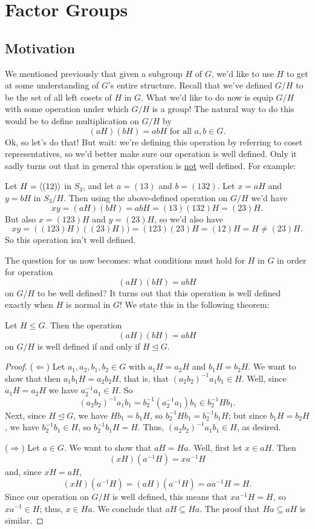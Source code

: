 \chapter{Factor Groups}\label{factorgps}%

\section{Motivation}

We mentioned previously that given a subgroup $H$ of $G$, we'd like
to use $H$ to get at some understanding of $G$'s entire structure.
Recall that we've defined $G/H$ to be the set of all left cosets of
$H$ in $G$.  What we'd like to do now is equip $G/H$ with some
operation under which $G/H$ is a group!  The natural way to do this
would be to define multiplication on $G/H$ by
$$(aH)(bH)=abH \mbox{ for all }a,b\in G.$$
Ok, so let's do that!  But wait: we're defining this operation
by referring to coset representatives, so we'd better make sure
our operation is well defined. Only it sadly turns out that in
general this operation is \underline{not} well defined. For
example:


\begin{example}{} Let $H=\langle(12)\rangle$ in $S_3$, and let $a=(13)$ and
$b=(132)$.  Let $x=aH$ and $y=bH$ in $S_3/H$. Then using the
above-defined operation on $G/H$ we'd have
$$xy=(aH)(bH)=abH=(13)(132)H=(23)H.$$ But also $x=(123)H$ and $y=(23)H$, so
we'd also have
$$xy=((123)H)((23)H))=(123)(23)H=(12)H=H\neq (23)H.$$
So this operation isn't well defined. \end{example}

 The question for us now becomes: what conditions must hold
for $H$ in $G$ in order for operation $$(aH)(bH)=abH$$ on $G/H$
to be well defined?  It turns out that this operation is well
defined exactly when $H$ is normal in $G$! We state this in the
following theorem:

\begin{thm}\label{} Let $H\leq G$.  Then the operation $$(aH)(bH)=abH$$ on
$G/H$ is well defined if and only if $H \unlhd G$. \end{thm}

\begin{proof}

($\Leftarrow$)  Let $a_1,a_2,b_1,b_2\in G$ with $a_1H=a_2H$ and
$b_1H=b_2H$.  We want to show that then $a_1b_1H=a_2b_2H$, that is,
that $(a_2b_2)^{-1}a_1b_1\in H$. Well, since $a_1H=a_2H$ we have
$a_2^{-1}a_1\in H$. So
$$(a_2b_2)^{-1}a_1b_1=b_2^{-1}(a_2^{-1}a_1)b_1 \in b_2^{-1}Hb_1.$$ Next, since $H\unlhd G$,
we have $Hb_1=b_1H$, so $b_2^{-1}Hb_1=b_2^{-1}b_1H$; but since
$b_1H=b_2H$, we have $b_2^{-1}b_1\in H$, so $b_2^{-1}b_1H=H$.  Thus,
$(a_2b_2)^{-1}a_1b_1\in H$, as desired.

($\Rightarrow$) Let $a\in G$.  We want to show that $aH=Ha$.  Well,
first let $x\in aH$.  Then $$(xH)(a^{-1}H)=xa^{-1}H$$ and, since
$xH=aH$,
$$(xH)(a^{-1}H)=(aH)(a^{-1}H)=aa^{-1}H=H.$$  Since our operation on $G/H$ is well defined, this means that
$xa^{-1}H=H$, so $xa^{-1}\in H$; thus, $x\in Ha$.  We conclude that
$aH\subseteq Ha$.  The proof that $Ha\subseteq aH$ is similar.\end{proof}

